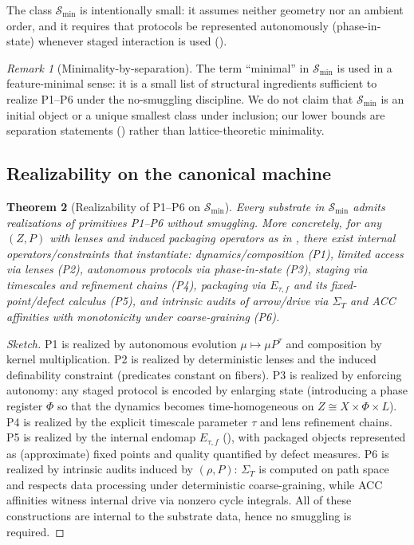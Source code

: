 \documentclass[11pt]{article}
\newtheorem{theorem}{Theorem}[section]
\theoremstyle{definition}
\theoremstyle{remark}
\newtheorem{remark}[theorem]{Remark}
\begin{document}
The class $\mathcal S_{\min}$ is intentionally small: it assumes neither geometry nor an ambient order, and it requires that protocols be represented autonomously (phase-in-state) whenever staged interaction is used ().

\begin{remark}[Minimality-by-separation]
The term ``minimal'' in $\mathcal S_{\min}$ is used in a feature-minimal sense: it is a small list of structural ingredients sufficient to realize P1--P6 under the no-smuggling discipline.
We do not claim that $\mathcal S_{\min}$ is an initial object or a unique smallest class under inclusion; our lower bounds are separation statements () rather than lattice-theoretic minimality.
\end{remark}

\subsection{Realizability on the canonical machine}

\begin{theorem}[Realizability of P1--P6 on $\mathcal S_{\min}$]
\label{thm:realizability}
Every substrate in $\mathcal S_{\min}$ admits realizations of primitives P1--P6 without smuggling.
More concretely, for any $(Z,P)$ with lenses and induced packaging operators as in , there exist internal operators/constraints that instantiate:
dynamics/composition (P1), limited access via lenses (P2), autonomous protocols via phase-in-state (P3),
staging via timescales and refinement chains (P4), packaging via $E_{\tau,f}$ and its fixed-point/defect calculus (P5),
and intrinsic audits of arrow/drive via $\Sigma_T$ and ACC affinities with monotonicity under coarse-graining (P6).
\end{theorem}

\begin{proof}[Sketch]
P1 is realized by autonomous evolution $\mu\mapsto \mu P^\tau$ and composition by kernel multiplication.
P2 is realized by deterministic lenses and the induced definability constraint (predicates constant on fibers).
P3 is realized by enforcing autonomy: any staged protocol is encoded by enlarging state (introducing a phase register $\Phi$ so that the dynamics becomes time-homogeneous on $Z\cong X\times\Phi\times L$).
P4 is realized by the explicit timescale parameter $\tau$ and lens refinement chains.
P5 is realized by the internal endomap $E_{\tau,f}$ (), with packaged objects represented as (approximate) fixed points and quality quantified by defect measures.
P6 is realized by intrinsic audits induced by $(\rho,P)$: $\Sigma_T$ is computed on path space and respects data processing under deterministic coarse-graining, while ACC affinities witness internal drive via nonzero cycle integrals.
All of these constructions are internal to the substrate data, hence no smuggling is required.
\end{proof}
\end{document}
